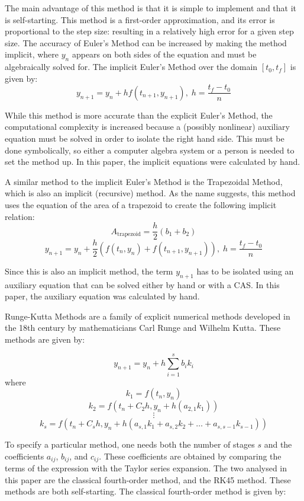 \documentclass[11pt]{article}
\begin{document}
The main advantage of this method is that it is simple to implement and that it
is self-starting. This method is a first-order approximation, and its error is
proportional to the step size: resulting in a relatively high error for a given
step size. The accuracy of Euler's Method can be increased by making the method 
implicit, where $y_n$ appears on both sides of the equation and must be algebraically
solved for. The implicit Euler's Method over the domain $[t_0, t_f]$ is given by:
$$y_{n+1} = y_{n}+hf(t_{n+1}, y_{n+1}),\; h=\frac{t_f-t_0}{n}$$

While this method is more accurate than the explicit Euler's Method, the computational
complexity is increased because a (possibly nonlinear) auxiliary equation must be
solved in order to isolate the right hand side. This must be done symbolically,
so either a computer algebra system or a person is needed to set the method up. In
this paper, the implicit equations were calculated by hand.

A similar method to the implicit Euler's Method is the Trapezoidal Method, which
is also an implicit (recursive) method. As the name suggests, this method uses the
equation of the area of a trapezoid to create the following implicit relation:
$$A_\mathrm{trapezoid}=\frac{h}{2}(b_{1}+b_{2})$$
$$y_{n+1}=y_{n}+\frac{h}{2}(f(t_{n}, y_{n})+f(t_{n+1}, y_{n+1})),\; h=\frac{t_f-t_0}{n}$$

Since this is also an implicit method, the term $y_{n+1}$ has to be isolated
using an auxiliary equation that can be solved either by hand or with a CAS.
In this paper, the auxiliary equation was calculated by hand.

Runge-Kutta Methods are a family of explicit numerical methods developed in the 18th
century by mathematicians Carl Runge and Wilhelm Kutta. These methods are given by:

$$y_{n+1}=y_{n}+h\sum_{i=1}^{s}b_{i}k_{i}$$
where
$$k_{1}=f(t_{n},y_{n})$$
$$k_{2}=f(t_{n}+C_{2}h,y_{n}+h(a_{2,1}k_{1}))$$
$$\vdots$$
$$k_{s}=f(t_{n}+C_{s}h,y_{n}+h(a_{s,1}k_{1}+a_{s,2}k_{2}+\dots+a_{s,s-1}k_{s-1}))$$

To specify a particular method, one needs both the number of stages $s$ and the
coefficients $a_{ij}$, $b_{ij}$, and $c_{ij}$. 
These coefficients are obtained by comparing the terms of the expression with the 
Taylor series expansion. The two
analysed in this paper are the classical fourth-order method, and the RK45 method.
These methods are both self-starting.
The classical fourth-order method is given by:
\end{document}
